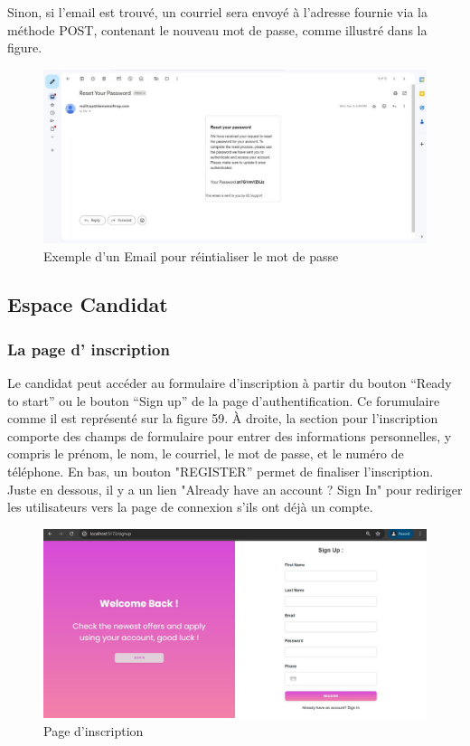 Sinon, si  l'email est  trouvé, un  courriel sera envoyé à l'adresse fournie via la méthode POST, contenant le  nouveau mot de  passe, comme illustré dans la figure.
\begin{figure}[htbp]
   \centering
   \includegraphics[scale=0.5]{screens/mailPssword.jpg} 
   \caption{Exemple d'un Email pour réintialiser le mot de passe}
   \label{fig:mailPass}
\end{figure}

\subsection{Espace Candidat}
\subsubsection{La page d’ inscription}
Le candidat peut accéder au formulaire d’inscription à partir du bouton “Ready to start” ou le bouton “Sign up” de la page d’authentification. Ce forumulaire comme il est représenté sur la figure 59. À droite, la section pour l'inscription comporte des champs de formulaire pour entrer des informations personnelles, y compris le prénom, le nom, le courriel, le mot de  passe, et  le numéro de téléphone. En bas, un bouton "REGISTER” permet de finaliser l'inscription. Juste en dessous, il y a un lien "Already have an account ? Sign In" pour rediriger les utilisateurs vers la page de connexion s’ils ont déjà un compte.

\begin{figure}[htbp]
   \centering
   \includegraphics[scale=0.5]{screens/signup.jpg} 
   \caption{Page d'inscription}
   \label{fig:singup}
\end{figure}

